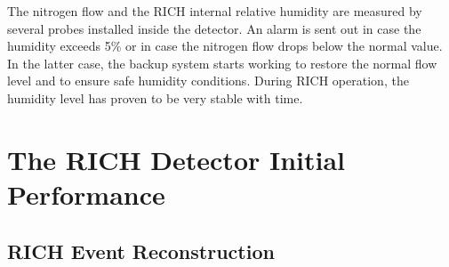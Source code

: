 \documentclass[5p,times,twocolumn]{elsarticle}
\begin{document}
The nitrogen flow and the RICH internal relative humidity are measured by several probes installed inside the
detector.
An alarm is sent out in case the humidity exceeds 5\% or in case the nitrogen flow drops below the normal value. 
In the latter case, the backup system starts working to restore the normal flow level and to ensure safe humidity
conditions. During RICH operation, the humidity level has proven to be very stable with time.


\section{The RICH Detector Initial Performance}

\subsection{RICH Event Reconstruction}
\label{sec:RICHReco}
\end{document}
